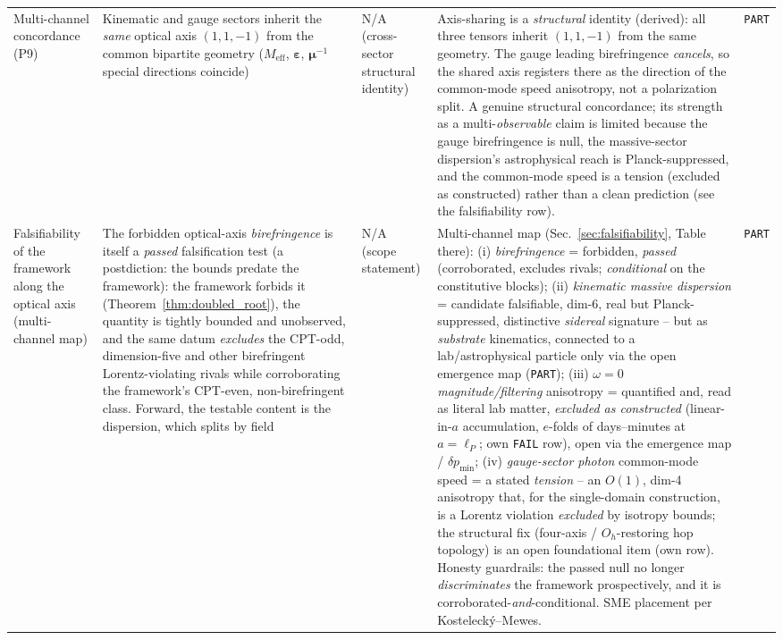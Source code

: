 {\begin{longtable}{@{}p{2.6cm}p{3.8cm}p{3.2cm}p{4.4cm}p{1.0cm}@{}}
Multi-channel concordance (P9)
    & Kinematic and gauge sectors inherit the \emph{same} optical axis $(1,1,-1)$ from the common bipartite geometry ($M_\text{eff}$, $\boldsymbol\varepsilon$, $\boldsymbol\mu^{-1}$ special directions coincide)
    & N/A (cross-sector structural identity)
    & Axis-sharing is a \emph{structural} identity (derived): all three tensors inherit $(1,1,-1)$ from the same geometry. The gauge leading birefringence \emph{cancels}, so the shared axis registers there as the direction of the common-mode speed anisotropy, not a polarization split. A genuine structural concordance; its strength as a multi-\emph{observable} claim is limited because the gauge birefringence is null, the massive-sector dispersion's astrophysical reach is Planck-suppressed, and the common-mode speed is a tension (excluded as constructed) rather than a clean prediction (see the falsifiability row).
    & \texttt{PART} \\

Falsifiability of the framework along the optical axis (multi-channel map)
    & The forbidden optical-axis \emph{birefringence} is itself a \emph{passed} falsification test (a postdiction: the bounds predate the framework): the framework forbids it (Theorem~\ref{thm:doubled_root}), the quantity is tightly bounded and unobserved, and the same datum \emph{excludes} the CPT-odd, dimension-five and other birefringent Lorentz-violating rivals while corroborating the framework's CPT-even, non-birefringent class. Forward, the testable content is the dispersion, which splits by field
    & N/A (scope statement)
    & Multi-channel map (Sec.~\ref{sec:falsifiability}, Table there): (i) \emph{birefringence} = forbidden, \emph{passed} (corroborated, excludes rivals; \emph{conditional} on the constitutive blocks); (ii) \emph{kinematic massive dispersion} = candidate falsifiable, dim-6, real but Planck-suppressed, distinctive \emph{sidereal} signature -- but as \emph{substrate} kinematics, connected to a lab/astrophysical particle only via the open emergence map (\texttt{PART}); (iii) \emph{$\omega=0$ magnitude/filtering} anisotropy = quantified and, read as literal lab matter, \emph{excluded as constructed} (linear-in-$a$ accumulation, $e$-folds of days--minutes at $a{=}\ell_P$; own \texttt{FAIL} row), open via the emergence map / $\delta p_\text{min}$; (iv) \emph{gauge-sector photon} common-mode speed = a stated \emph{tension} -- an $O(1)$, dim-4 anisotropy that, for the single-domain construction, is a Lorentz violation \emph{excluded} by isotropy bounds; the structural fix (four-axis / $O_h$-restoring hop topology) is an open foundational item (own row). Honesty guardrails: the passed null no longer \emph{discriminates} the framework prospectively, and it is corroborated-\emph{and}-conditional. SME placement per Kosteleck\'y--Mewes.
    & \texttt{PART} \\

\hline
\end{longtable}
}
